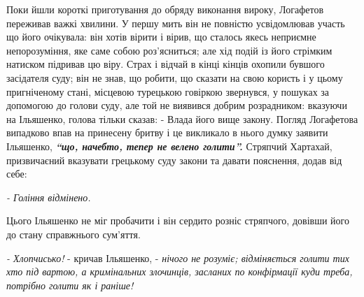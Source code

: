 \documentclass[a4paper,20pt]{report}
\begin{document}
Поки йшли короткі приготування до обряду виконання вироку, Логафетов переживав 
важкі хвилини. У першу мить він не повністю усвідомлював участь що його очікувала:
він хотів вірити і вірив, що сталось якесь неприємне непорозуміння, яке саме собою
роз'ясниться; але хід подій із його стрімким натиском підривав цю віру. Страх і відчай
в кінці кінців охопили бувшого засідателя суду; він не знав, що робити, що сказати
на свою користь і у цьому пригніченому стані, місцевою турецькою говіркою звернувся,
у пошуках за допомогою до голови суду, але той не виявився добрим розрадником:
вказуючи на Ільяшенко, голова тільки сказав:
- Влада його вище закону.
Погляд Логафетова випадково впав на принесену бритву і це викликало в нього
думку заявити Ільяшенко, 
\textbf{\emph{``що, начебто, тепер не велено голити''.}}
Стряпчий Хартахай, призвичаєний вказувати грецькому суду закони
та давати пояснення, додав від себе:

\emph{- Гоління відмінено.}

Цього Ільяшенко не міг пробачити і він сердито розніс стряпчого, довівши
його до стану справжнього сум'яття.

\emph{- Хлопчисько!} - кричав Ільяшенко, - \emph{нічого не розуміє; відміняється
голити тих хто під вартою, а кримінальних злочинців, засланих по конфірмації куди треба,
потрібно голити як і раніше!}
\end{document}
